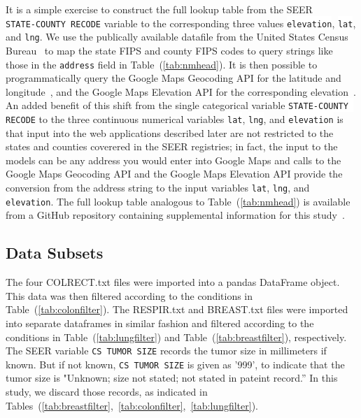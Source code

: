 \documentclass[10pt,letterpaper]{article}
\newcommand{\codewhite}[1]{\colorbox{white}{\texttt{#1}}}
\begin{document}
It is a simple exercise to construct the full lookup table from the SEER \\  \codewhite{STATE-COUNTY RECODE} variable to the corresponding three values \codewhite{elevation}, \codewhite{lat}, and \codewhite{lng}. We use the publically available datafile from the United States Census Bureau~\cite{census} to map the state FIPS and county FIPS codes to query strings like those in the \codewhite{address} field in Table~(\ref{tab:nmhead}). 
It is then possible to programmatically query the Google Maps Geocoding API for the latitude and longitude~\cite{geocode}, and the Google Maps Elevation API for the corresponding elevation~\cite{elevation}.
An added benefit of this shift from the single categorical variable \codewhite{STATE-COUNTY RECODE} to the three continuous numerical variables \codewhite{lat}, \codewhite{lng}, and \codewhite{elevation} is that input into the web applications described later are not restricted to the states and counties coverered in the SEER registries; in fact, the input to the models can be any address you would enter into Google Maps and calls to the Google Maps Geocoding API and the Google Maps Elevation API provide the conversion from the address string to the input variables \codewhite{lat}, \codewhite{lng}, and \codewhite{elevation}. The full lookup table analogous to Table~(\ref{tab:nmhead}) is available from a GitHub repository containing supplemental information for this study~\cite{supp}. 



\subsection*{Data Subsets}
\label{sec:subsets}

 The four COLRECT.txt files were imported into a pandas DataFrame object.
This data was then filtered according to the conditions in Table~(\ref{tab:colonfilter}).
The RESPIR.txt and BREAST.txt files were imported into separate dataframes in similar fashion and filtered according
to the conditions in Table~(\ref{tab:lungfilter}) and Table~(\ref{tab:breastfilter}), respectively.
The SEER variable \codewhite{CS TUMOR SIZE} records the tumor size in millimeters if known. But if not known, \codewhite{CS TUMOR SIZE} is given as '999', to indicate that the tumor size is "Unknown; size not stated; not stated in pateint record.'' In this study, we discard those records, as indicated in Tables~(\ref{tab:breastfilter},~\ref{tab:colonfilter},~\ref{tab:lungfilter}).
\end{document}
